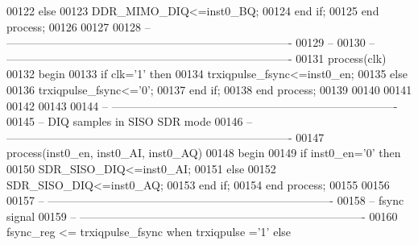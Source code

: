 \begin{DoxyCode}
00122     \textcolor{keywordflow}{else} 
00123         \textcolor{vhdlchar}{DDR_MIMO_DIQ}\textcolor{vhdlchar}{<=}\textcolor{vhdlchar}{inst0_BQ};
00124     \textcolor{keywordflow}{end} \textcolor{keywordflow}{if};
00125 \textcolor{keywordflow}{end} \textcolor{keywordflow}{process};
00126 
00127 
00128 \textcolor{keyword}{-- ----------------------------------------------------------------------------}
00129 \textcolor{keyword}{-- }
00130 \textcolor{keyword}{-- ----------------------------------------------------------------------------}
00131 \textcolor{keywordflow}{process}(clk) 
00132 \textcolor{vhdlkeyword}{    begin }
00133     \textcolor{keywordflow}{if} \textcolor{vhdlchar}{clk}\textcolor{vhdlchar}{=}\textcolor{vhdlchar}{'}\textcolor{vhdllogic}{}\textcolor{vhdllogic}{1}\textcolor{vhdlchar}{'}  \textcolor{keywordflow}{then} 
00134         \textcolor{vhdlchar}{trxiqpulse_fsync}\textcolor{vhdlchar}{<=}\textcolor{vhdlchar}{inst0_en};
00135     \textcolor{keywordflow}{else} 
00136         \textcolor{vhdlchar}{trxiqpulse_fsync}\textcolor{vhdlchar}{<=}\textcolor{vhdlchar}{'}\textcolor{vhdllogic}{}\textcolor{vhdllogic}{0}\textcolor{vhdlchar}{'};
00137     \textcolor{keywordflow}{end} \textcolor{keywordflow}{if};
00138 \textcolor{keywordflow}{end} \textcolor{keywordflow}{process};
00139 
00140 
00141 
00142 
00143 
00144 \textcolor{keyword}{-- ----------------------------------------------------------------------------}
00145 \textcolor{keyword}{-- DIQ samples in SISO SDR mode}
00146 \textcolor{keyword}{-- ----------------------------------------------------------------------------}
00147 \textcolor{keywordflow}{process}(inst0_en, inst0_AI, inst0_AQ) 
00148 \textcolor{vhdlkeyword}{    begin }
00149     \textcolor{keywordflow}{if} \textcolor{vhdlchar}{inst0_en}\textcolor{vhdlchar}{=}\textcolor{vhdlchar}{'}\textcolor{vhdllogic}{}\textcolor{vhdllogic}{0}\textcolor{vhdlchar}{'} \textcolor{keywordflow}{then} 
00150         \textcolor{vhdlchar}{SDR_SISO_DIQ}\textcolor{vhdlchar}{<=}\textcolor{vhdlchar}{inst0_AI};
00151     \textcolor{keywordflow}{else} 
00152         \textcolor{vhdlchar}{SDR_SISO_DIQ}\textcolor{vhdlchar}{<=}\textcolor{vhdlchar}{inst0_AQ};
00153     \textcolor{keywordflow}{end} \textcolor{keywordflow}{if};
00154 \textcolor{keywordflow}{end} \textcolor{keywordflow}{process};
00155 
00156 
00157 \textcolor{keyword}{-- ----------------------------------------------------------------------------}
00158 \textcolor{keyword}{-- fsync signal }
00159 \textcolor{keyword}{-- ----------------------------------------------------------------------------}
00160 \textcolor{vhdlchar}{fsync_reg} \textcolor{vhdlchar}{<=}    \textcolor{vhdlchar}{trxiqpulse_fsync} \textcolor{keywordflow}{when} \textcolor{vhdlchar}{trxiqpulse} \textcolor{vhdlchar}{=}\textcolor{vhdlchar}{'}\textcolor{vhdllogic}{}\textcolor{vhdllogic}{1}\textcolor{vhdlchar}{'} \textcolor{keywordflow}{else} 

\end{DoxyCode}
